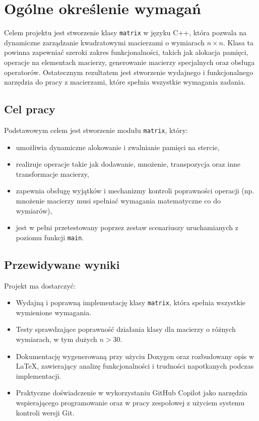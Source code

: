 \newpage
\section{Ogólne określenie wymagań}		%

Celem projektu jest stworzenie klasy \texttt{matrix} w języku C++, która pozwala na dynamiczne zarządzanie kwadratowymi macierzami o wymiarach \( n \times n \). Klasa ta powinna zapewniać szeroki zakres funkcjonalności, takich jak alokacja pamięci, operacje na elementach macierzy, generowanie macierzy specjalnych oraz obsługa operatorów. Ostatecznym rezultatem jest stworzenie wydajnego i funkcjonalnego narzędzia do pracy z macierzami, które spełnia wszystkie wymagania zadania.


\subsection{Cel pracy}
Podstawowym celem jest stworzenie modułu \texttt{matrix}, który:
\begin{itemize}
  \item umożliwia dynamiczne alokowanie i zwalnianie pamięci na stercie,
  \item realizuje operacje takie jak dodawanie, mnożenie, transpozycja oraz inne transformacje macierzy,
  \item zapewnia obsługę wyjątków i mechanizmy kontroli poprawności operacji (np. mnożenie macierzy musi spełniać wymagania matematyczne co do wymiarów),
  \item jest w pełni przetestowany poprzez zestaw scenariuszy uruchamianych z poziomu funkcji \texttt{main}.
\end{itemize}

\subsection{Przewidywane wyniki}
Projekt ma dostarczyć:
\begin{itemize}
  \item Wydajną i poprawną implementację klasy \texttt{matrix}, która spełnia wszystkie wymienione wymagania.
  \item Testy sprawdzające poprawność działania klasy dla macierzy o różnych wymiarach, w tym dużych \( n > 30 \).
  \item Dokumentację wygenerowaną przy użyciu Doxygen oraz rozbudowany opis w LaTeX, zawierający analizę funkcjonalności i trudności napotkanych podczas implementacji.
  \item Praktyczne doświadczenie w wykorzystaniu GitHub Copilot jako narzędzia wspierającego programowanie oraz w pracy zespołowej z użyciem systemu kontroli wersji Git.
\end{itemize}

